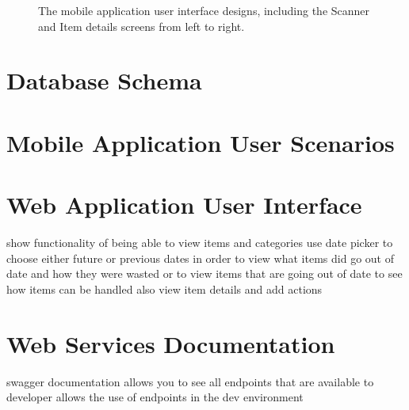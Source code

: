 \documentclass[a4paper,11pt]{report}
\begin{document}
\begin{appendix}
\begin{figure}[H]
        \caption{The mobile application user interface designs, including the Scanner and Item details screens from left to right.}
        \label{fig:mobileUIpt2}
    \end{figure}
    \chapter{Database Schema}
    \chapter{Mobile Application User Scenarios}


    \chapter{Web Application User Interface}
    show functionality of being able to view items and categories 
    use date picker to choose either future or previous dates in order to view what items did go out of date and how they were wasted or to view items that are going out of date to see how items can be handled
    also view item details and add actions
    \chapter{Web Services Documentation}
    swagger documentation
    allows you to see all endpoints that are available to developer
    allows the use of endpoints in the dev environment
\end{appendix}
\end{document}
